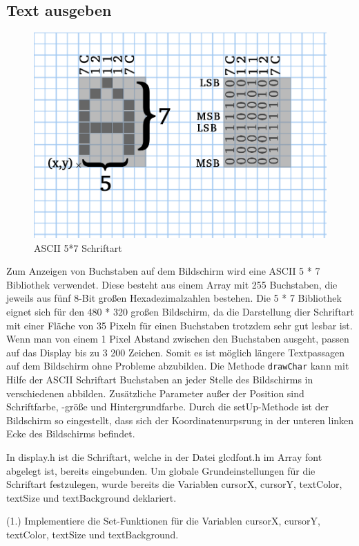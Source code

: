 \subsection{Text ausgeben}
\begin{figure}
	\begin{centering}
		\includegraphics[width=.5\textwidth]{./05_c/figures/ASCII57.png}
		\caption{ASCII 5*7 Schriftart}
		\label{fig:ascii57}
	\end{centering}
\end{figure}
Zum Anzeigen von Buchstaben auf dem Bildschirm wird eine ASCII 5 * 7 Bibliothek verwendet. Diese besteht aus einem Array mit 255 Buchstaben, die jeweils aus f{\"u}nf 8-Bit gro{\ss}en Hexadezimalzahlen bestehen. Die 5 * 7 Bibliothek eignet sich f{\"u}r den 480 * 320 gro{\ss}en Bildschirm, da die Darstellung dier Schriftart mit einer Fl{\"a}che von 35 Pixeln f{\"u}r einen Buchstaben trotzdem sehr gut lesbar ist. Wenn man von einem 1 Pixel Abstand zwischen den Buchstaben ausgeht, passen auf das Display bis zu 3 200 Zeichen. Somit es ist m{\"o}glich l{\"a}ngere Textpassagen auf dem Bildschirm ohne Probleme abzubilden. Die Methode \texttt{drawChar} kann mit Hilfe der ASCII Schriftart Buchstaben an jeder Stelle des Bildschirms in verschiedenen abbilden. Zus{\"a}tzliche Parameter au{\ss}er der Position sind Schriftfarbe, -gr{\"o}{\ss}e und Hintergrundfarbe. Durch die setUp-Methode ist der Bildschirm so eingestellt, dass sich der Koordinatenurpsrung in der unteren linken Ecke des Bildschirms befindet.  

In display.h ist die Schriftart, welche in der Datei glcdfont.h im Array font abgelegt ist, bereits eingebunden. Um globale Grundeinstellungen für die Schriftart festzulegen, wurde bereits die Variablen cursorX, cursorY, textColor, textSize und textBackground deklariert. 

(1.) Implementiere die Set-Funktionen für die Variablen cursorX, cursorY, textColor, textSize und textBackground.

